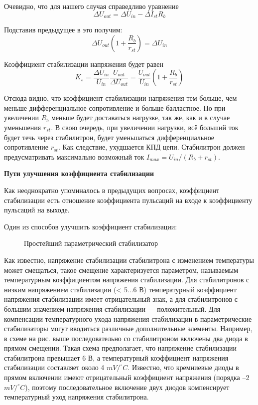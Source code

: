 Очевидно, что для нашего случая справедливо уравнение
$$
\Delta U_{out} = \Delta U_{in} - \Delta I_{st}R_b
$$

Подставив предыдущее в это получим:
$$
\Delta U_{out}\left(1 + \frac{R_b}{r_{st}} \right) = \Delta U_{in}
$$

Коэффициент стабилизации напряжения будет равен
$$
K_s = \frac{\Delta U_{in}}{U_{in}}\frac{U_{out}}{\Delta U_{out}} = \frac{U_{out}}{U_{in}}\left( 1 + \frac{R_b}{r_{st}}\right)
$$

Отсюда видно, что коэффициент стабилизации напряжения тем больше, чем меньше дифференциальное сопротивление и больше балластное. Но при увеличении $R_b$ меньше будет доставаться нагрузке, так же, как и в случае уменьшения $r_{st}$. В свою очередь, при увеличении нагрузки, всё больший ток будет течь через стабилитрон, будет уменьшаться дифференциальное сопротивление $r_{st}$. Как следствие, ухудшается КПД цепи. Стабилитрон должен предусматривать максимально возможный ток $I_{max} = U_{in}/(R_b + r_{st})$.

\textbf{Пути улучшения коэффициента стабилизации}

Как неоднократно упоминалось в предыдущих вопросах, коэффициент стабилизации есть отношение коэффициента пульсаций на входе к коэффициенту пульсаций на выходе. 

Один из способов улучшить коэффициент стабилизации:
\begin{center}
	\begin{figure}[h!]
		\caption{Простейший параметрический стабилизатор}
	\end{figure}
\end{center}

Как известно, напряжение стабилизации стабилитрона с изменением температуры может смещаться, такое смещение характеризуется параметром, называемым температурным коэффициентом напряжения стабилизации. Для стабилитронов с низким напряжением стабилизации (< 5...6 В) температурный коэффициент напряжения стабилизации имеет отрицательный знак, а для стабилитронов с большим значением напряжения стабилизации — положительный. Для компенсации температурного ухода напряжения стабилизации в параметрические стабилизаторы могут вводиться различные дополнительные элементы. Например, в схеме на рис. выше последовательно со стабилитроном включены два диода в прямом смещении. Такая схема предполагает, что напряжение стабилизации стабилитрона превышает 6 В, а температурный коэффициент напряжения стабилизации составляет около 4 $mV/^{\circ}C$. Известно, что кремниевые диоды в прямом включении имеют отрицательный коэффициент напряжения (порядка –2 $mV/^{\circ}C$), поэтому последовательное включение двух диодов компенсирует температурный уход напряжения стабилитрона.

